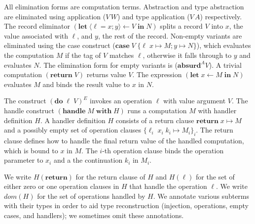 \documentclass[mscres,icsa,lfcs,twoside,openright,logo,rightchapter,normalheadings]{infthesis}
\theoremstyle{definition}
\newcommand{\revto}{\ensuremath{\leftarrow}}
\newcommand{\keyw}[1]{\textbf{#1}}
\newcommand{\Handle}{\keyw{handle}}
\newcommand{\With}{\keyw{with}}
\newcommand{\Let}{\keyw{let}}
\newcommand{\In}{\keyw{in}}
\newcommand{\Do}{\keyw{do}}
\newcommand{\Return}{\keyw{return}}
\newcommand{\Case}{\keyw{case}}
\newcommand{\Absurd}{\keyw{absurd}}
\newcommand{\Record}[1]{\ensuremath{\langle #1 \rangle}}
\begin{document}
All elimination forms are computation terms. Abstraction and type
abstraction are eliminated using application ($V\,W$) and type
application ($V\,A$) respectively.
%
The record eliminator $(\Let \; \Record{\ell=x;y} \revto V \; \In \;
N)$ splits a record $V$ into $x$, the value associated with $\ell$,
and $y$, the rest of the record. Non-empty variants are eliminated
using the case construct ($\Case\; V\; \{\ell\; x \mapsto M; y \mapsto
N\}$), which evaluates the computation $M$ if the tag of $V$ matches
$\ell$, otherwise it falls through to $y$ and evaluates $N$.  The
elimination form for empty variants is ($\Absurd^A V$). A trivial
computation $(\Return\;V)$ returns value $V$. The expression $(\Let \;
x \revto M \; \In \; N)$ evaluates $M$ and binds the result value to
$x$ in $N$.

The construct $(\Do \; \ell \; V)^E$ invokes an operation $\ell$ with
value argument $V$. The handle construct $(\Handle \; M \; \With \;
H)$ runs a computation $M$ with handler definition $H$. A handler
definition $H$ consists of a return clause $\Return \; x \mapsto M$
and a possibly empty set of operation clauses $\{\ell_i \; x_i \; k_i
\mapsto M_i\}_i$. The return clause defines how to handle the final
return value of the handled computation, which is bound to $x$ in $M$.
%
The $i$-th operation clause binds the operation parameter to $x_i$ and
a the continuation $k_i$ in $M_i$.

We write $H(\Return)$ for the return clause of $H$ and $H(\ell)$ for
the set of either zero or one operation clauses in $H$ that handle the
operation $\ell$. We write $dom(H)$ for the set of operations handled
by $H$.
%
We annotate various subterms with their types in order to aid type
reconstruction (injection, operations, empty cases, and handlers); we
sometimes omit these annotations.

\end{document}
